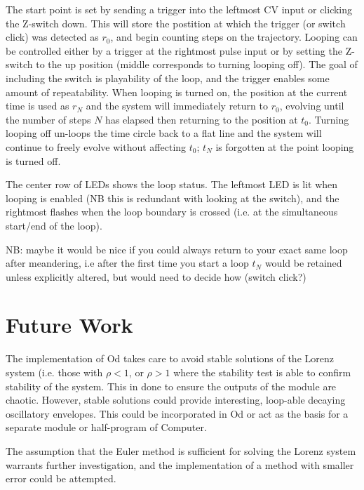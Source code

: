 \documentclass{tufte-handout}
\begin{document}
The start point is set by sending a trigger into the leftmost CV input or clicking the Z-switch down. This will store the postition at which the trigger (or switch click) was detected as $r_0$, and begin counting steps on the trajectory. Looping can be controlled either by a trigger at the rightmost pulse input or by setting the Z-switch to the up position (middle corresponds to turning looping off). The goal of including the switch is playability of the loop, and the trigger enables some amount of repeatability. When looping is turned on, the position at the current time is used as $r_N$ and the system will immediately return to $r_0$, evolving until the number of steps $N$ has elapsed then returning to the position at $t_0$. Turning looping off un-loops the time circle back to a flat line and the system will continue to freely evolve without affecting $t_0$; $t_N$ is forgotten at the point looping is turned off.

The center row of LEDs shows the loop status. The leftmost LED is lit when looping is enabled (NB this is redundant with looking at the switch), and the rightmost flashes when the loop boundary is crossed (i.e. at the simultaneous start/end of the loop).

NB: maybe it would be nice if you could always return to your exact same loop after meandering, i.e after the first time you start a loop $t_N$ would be retained unless explicitly altered, but would need to decide how (switch click?)


\section{Future Work}\label{sec:future_work}

The implementation of Od takes care to avoid stable solutions of the Lorenz system (i.e. those with $\rho < 1$, or $\rho > 1$ where the stability test is able to confirm stability of the system. This in done to ensure the outputs of the module are chaotic. However, stable solutions could provide interesting, loop-able decaying oscillatory envelopes. This could be incorporated in Od or act as the basis for a separate module or half-program of Computer.

The assumption that the Euler method is sufficient for solving the Lorenz system warrants further investigation, and the implementation of a method with smaller error could be attempted.




\end{document}
